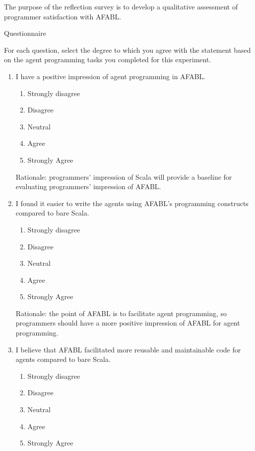 The purpose of the reflection survey is to develop a qualitative assessment of programmer satisfaction with AFABL.

Questionnaire

For each question, select the degree to which you agree with the statement based on
the agent programming tasks you completed for this experiment.

\begin{enumerate}
\item I have a positive impression of agent programming in AFABL.

\begin{enumerate}
\item Strongly disagree
\item Disagree
\item Neutral
\item Agree
\item Strongly Agree
\end{enumerate}

Rationale: programmers’ impression of Scala will provide a baseline for evaluating
programmers’ impression of AFABL.

\item I found it easier to write the agents using AFABL’s programming constructs compared to bare Scala.

\begin{enumerate}
\item Strongly disagree
\item Disagree
\item Neutral
\item Agree
\item Strongly Agree
\end{enumerate}

Rationale: the point of AFABL is to facilitate agent programming, so programmers should have a more positive impression of AFABL for agent programming.

\item I believe that AFABL facilitated more reusable and maintainable code for agents compared to bare Scala.

\begin{enumerate}
\item Strongly disagree
\item Disagree
\item Neutral
\item Agree
\item Strongly Agree
\end{enumerate}


\end{enumerate}
